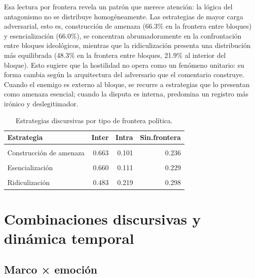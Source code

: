 \documentclass[
  letterpaper,
  numbers=noendperiod,
  fontsize=11pt,
  DIV=12,
  titlepage=false]{scrreprt}
\begin{document}
Esa lectura por frontera revela un patrón que merece atención: la lógica
del antagonismo no se distribuye homogéneamente. Las estrategias de
mayor carga adversarial, esto es, construcción de amenaza (66.3\% en la
frontera entre bloques) y esencialización (66.0\%), se concentran
abrumadoramente en la confrontación entre bloques ideológicos, mientras
que la ridiculización presenta una distribución más equilibrada (48.3\%
en la frontera entre bloques, 21.9\% al interior del bloque). Esto
sugiere que la hostilidad no opera como un fenómeno unitario: su forma
cambia según la arquitectura del adversario que el comentario construye.
Cuando el enemigo es externo al bloque, se recurre a estrategias que lo
presentan como amenaza esencial; cuando la disputa es interna, predomina
un registro más irónico y deslegitimador.

\newpage

\begin{longtable}[t]{lrrr}

\caption{\label{tbl-estrategia-frontera}Estrategias discursivas por tipo
de frontera política.}

\tabularnewline

\toprule
Estrategia & Inter & Intra & Sin.frontera\\
\midrule
\cellcolor{gray!10}{Atribución oculta} & \cellcolor{gray!10}{0.548} & \cellcolor{gray!10}{0.175} & \cellcolor{gray!10}{0.277}\\
Construcción de amenaza & 0.663 & 0.101 & 0.236\\
\cellcolor{gray!10}{Deslegitimación} & \cellcolor{gray!10}{0.578} & \cellcolor{gray!10}{0.183} & \cellcolor{gray!10}{0.239}\\
Esencialización & 0.660 & 0.111 & 0.229\\
\cellcolor{gray!10}{Ninguna} & \cellcolor{gray!10}{0.329} & \cellcolor{gray!10}{0.130} & \cellcolor{gray!10}{0.540}\\
\addlinespace
Ridiculización & 0.483 & 0.219 & 0.298\\
\bottomrule

\end{longtable}

\section{Combinaciones discursivas y dinámica
temporal}\label{combinaciones-discursivas-y-dinuxe1mica-temporal}

\subsection{Marco × emoción}\label{marco-emociuxf3n}
\end{document}
